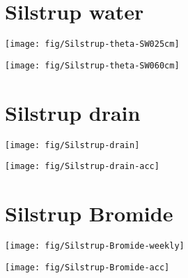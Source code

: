 \documentclass[fullpage,a4paper]{article}
\begin{document}
\section*{Silstrup water}

\texttt{[image: fig/Silstrup-theta-SW025cm]}

\texttt{[image: fig/Silstrup-theta-SW060cm]}

\section*{Silstrup drain}

\texttt{[image: fig/Silstrup-drain]}

\texttt{[image: fig/Silstrup-drain-acc]}

\section*{Silstrup Bromide}

\texttt{[image: fig/Silstrup-Bromide-weekly]}

\texttt{[image: fig/Silstrup-Bromide-acc]}
\end{document}
